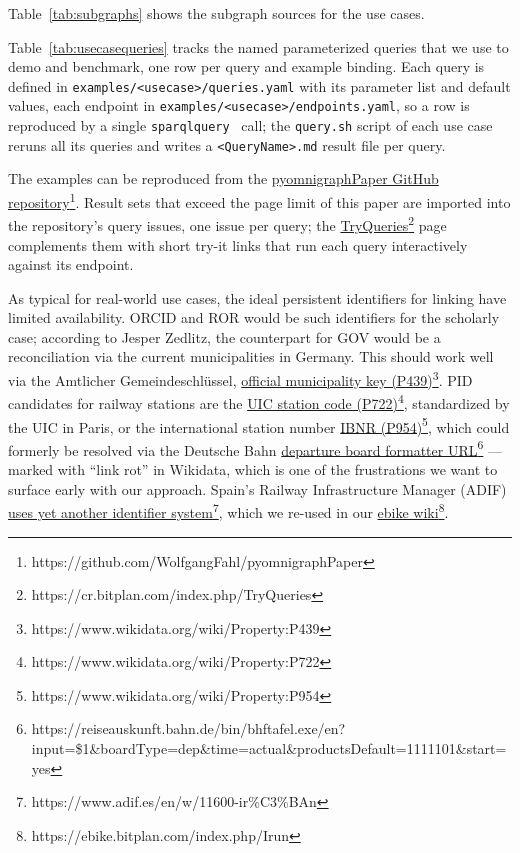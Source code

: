 \documentclass[
]{ceurart}
\newcommand{\tquote}[1]{``#1''}
\newcommand{\footnotelink}[2]{\href{#1}{#2}\footnote{#1}}
\newcommand{\wdp}[2]{\footnotelink{https://www.wikidata.org/wiki/Property:#2}{#1 (#2)}}
\begin{document}
Table~\ref{tab:subgraphs} shows the subgraph sources for the use cases.

Table~\ref{tab:usecasequeries} tracks the named parameterized queries that we use to demo and benchmark, one row per query and example binding. Each query is defined
in \texttt{examples/<usecase>/queries.yaml} with its parameter list and default values, each endpoint in \texttt{examples/<usecase>/endpoints.yaml}, so a row is reproduced by a single \texttt{sparqlquery}~\cite{pylodstorage} call; the \texttt{query.sh} script of each use case reruns all its queries and writes a \texttt{<QueryName>.md} result file per query.

The examples can be reproduced from the \footnotelink{https://github.com/WolfgangFahl/pyomnigraphPaper}{pyomnigraphPaper GitHub repository}. Result sets that exceed the page limit of this paper are imported into the repository's query issues, one issue per query; the \footnotelink{https://cr.bitplan.com/index.php/TryQueries}{TryQueries} page complements them with short try-it links that run each query interactively against its endpoint.

As typical for real-world use cases, the ideal persistent identifiers for linking have limited availability. ORCID and ROR would be such identifiers for the scholarly case; according to Jesper Zedlitz, the counterpart for GOV would be a reconciliation via the current municipalities in Germany. This should work well via the Amtlicher Gemeindeschlüssel, \wdp{official municipality key}{P439}.
PID candidates for railway stations are the \wdp{UIC station code}{P722}, standardized by the UIC in Paris, or the international station number \wdp{IBNR}{P954}, which could formerly be resolved via the Deutsche Bahn \footnotelink{https://reiseauskunft.bahn.de/bin/bhftafel.exe/en?input=\$1\&boardType=dep\&time=actual\&productsDefault=1111101\&start=yes}{departure board formatter URL} --- marked with \tquote{link rot} in Wikidata, which is one of the frustrations we want to surface early with our approach. Spain's Railway Infrastructure Manager (ADIF) \footnotelink{https://www.adif.es/en/w/11600-ir\%C3\%BAn}{uses yet another identifier system}, which we re-used in our \footnotelink{https://ebike.bitplan.com/index.php/Irun}{ebike wiki}.
\end{document}
